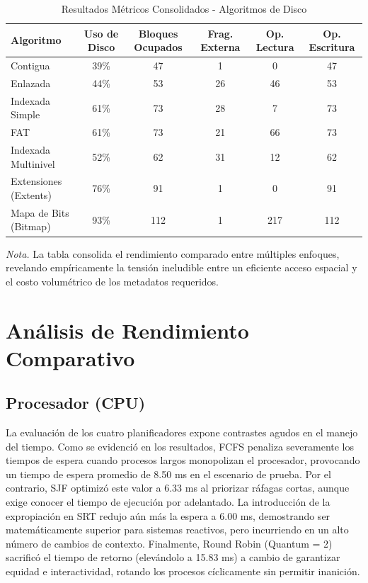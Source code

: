 \documentclass[12pt,a4paper]{article}
\begin{document}
\begin{table}[H]
\centering\footnotesize
\caption{Resultados Métricos Consolidados - Algoritmos de Disco}
\begin{tabularx}{\textwidth}{l c c c c c}
\toprule
\textbf{Algoritmo} & \textbf{Uso de Disco} & \textbf{Bloques Ocupados} & \textbf{Frag. Externa} & \textbf{Op. Lectura} & \textbf{Op. Escritura} \\
\midrule
Contigua & 39\% & 47 & 1 & 0 & 47 \\
Enlazada & 44\% & 53 & 26 & 46 & 53 \\
Indexada Simple & 61\% & 73 & 28 & 7 & 73 \\
FAT & 61\% & 73 & 21 & 66 & 73 \\
Indexada Multinivel & 52\% & 62 & 31 & 12 & 62 \\
Extensiones (Extents) & 76\% & 91 & 1 & 0 & 91 \\
Mapa de Bits (Bitmap) & 93\% & 112 & 1 & 217 & 112 \\
\bottomrule
\end{tabularx}
    \par\vspace{0.2cm}\raggedright \textit{Nota.} La tabla consolida el rendimiento comparado entre múltiples enfoques, revelando empíricamente la tensión ineludible entre un eficiente acceso espacial y el costo volumétrico de los metadatos requeridos.
\end{table}

\section{Análisis de Rendimiento Comparativo}

\subsection{Procesador (CPU)}
La evaluación de los cuatro planificadores expone contrastes agudos en el manejo del tiempo. Como se evidenció en los resultados, FCFS penaliza severamente los tiempos de espera cuando procesos largos monopolizan el procesador, provocando un tiempo de espera promedio de 8.50 ms en el escenario de prueba. Por el contrario, SJF optimizó este valor a 6.33 ms al priorizar ráfagas cortas, aunque exige conocer el tiempo de ejecución por adelantado. La introducción de la expropiación en SRT redujo aún más la espera a 6.00 ms, demostrando ser matemáticamente superior para sistemas reactivos, pero incurriendo en un alto número de cambios de contexto. Finalmente, Round Robin (Quantum = 2) sacrificó el tiempo de retorno (elevándolo a 15.83 ms) a cambio de garantizar equidad e interactividad, rotando los procesos cíclicamente sin permitir inanición.
\end{document}
